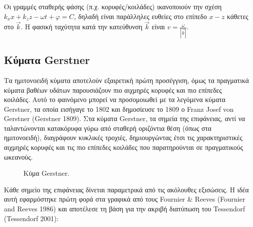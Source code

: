 \documentclass[a4paper, 11pt]{article}
\begin{document}
Οι γραμμές σταθερής φάσης (π.χ. κορυφές/κοιλάδες) ικανοποιούν την σχέση
\(k_x x + k_z z - \omega t + \varphi = C\), δηλαδή είναι παράλληλες
ευθείες στο επίπεδο \(x\!-\!z\) κάθετες στο \(\vec{k}\). Η φασική
ταχύτητα κατά την κατεύθυνση \(\vec{k}\) είναι
\(v=\frac{\omega}{|\vec{k}|}\).

\subsection{Κύματα
Gerstner}\label{ux3baux3cdux3bcux3b1ux3c4ux3b1-gerstner}

Τα ημιτονοειδή κύματα αποτελούν εξαιρετική πρώτη προσέγγιση, όμως τα
πραγματικά κύματα βαθέων υδάτων παρουσιάζουν πιο αιχμηρές κορυφές και
πιο επίπεδες κοιλάδες. Αυτό το φαινόμενο μπορεί να προσομοιωθεί με τα
λεγόμενα κύματα Gerstner, τα οποία εισήγαγε το 1802 και δημοσίευσε το
1809 ο Franz Josef von Gerstner (Gerstner 1809). Στα κύματα Gerstner, τα
σημεία της επιφάνειας, αντί να ταλαντώνονται κατακόρυφα γύρω από σταθερή
οριζόντια θέση (όπως στα ημιτονοειδή), διαγράφουν κυκλικές τροχιές,
δημιουργώντας έτσι τις χαρακτηριστικές αιχμηρές κορυφές και τις πιο
επίπεδες κοιλάδες που παρατηρούνται σε πραγματικούς ωκεανούς.

\begin{figure}[htbp]
\centering
{}
\caption{Κύμα Gerstner.}
\label{fig:gerstner}
\end{figure}

Κάθε σημείο της επιφάνειας δίνεται παραμετρικά από τις ακόλουθες
εξισώσεις. Η ιδέα αυτή εφαρμόστηκε πρώτη φορά στα γραφικά από τους
Fournier \& Reeves (Fournier and Reeves 1986) και αποτέλεσε τη βάση για
την ακριβή διατύπωση του Tessendorf (Tessendorf 2001):
\end{document}
